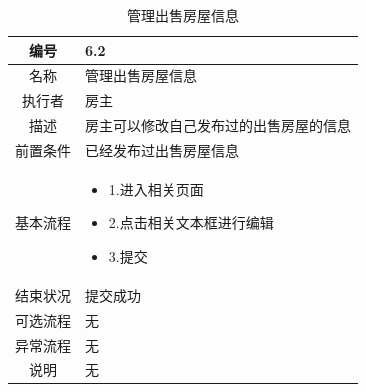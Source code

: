 \begin{table}[htbp]
	\centering
	\begin{tabular}{|c|p{11cm}|}
        \hline
        编号 & 6.2 \\
        \hline
        名称 & 管理出售房屋信息 \\ 
        \hline
        执行者 & 房主 \\
        \hline
        描述 & 房主可以修改自己发布过的出售房屋的信息 \\
        \hline
        前置条件 & 已经发布过出售房屋信息 \\
        \hline
        基本流程 & \begin{itemize}
            \item 1.进入相关页面
            \item 2.点击相关文本框进行编辑
            \item  3.提交
        \end{itemize} \\
        \hline
        结束状况 & 提交成功 \\
        \hline
        可选流程 & 无 \\
        \hline
        异常流程 & 无 \\
        \hline
        说明 & 无 \\
        \hline
    \end{tabular}
    \caption{管理出售房屋信息}
\end{table}

